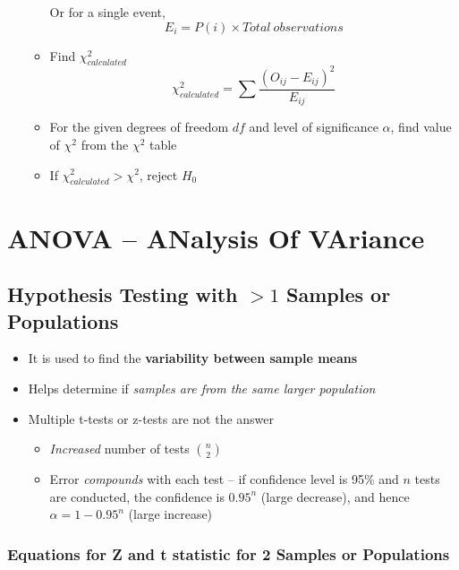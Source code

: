 \documentclass{article}
\begin{document}
\begin{itemize}
\begin{itemize}
\begin{equation}
        \end{equation}
        Or for a single event, 
        \begin{equation}
            E_{i} = P(i) \times {Total\ observations}
        \end{equation}
        \item Find $\chi^2_{calculated}$
        \begin{equation}
            \chi^2_{calculated} = \sum \frac{(O_{ij} - E_{ij})^2}{E_{ij}}
        \end{equation}
        \item For the given degrees of freedom $df$ and level of significance $\alpha$, find value of $\chi^2$ from the $\chi^2$ table
        \item If $\chi^2_{calculated} > \chi^2$, reject $H_0$
    \end{itemize}
\end{itemize}

\section{ANOVA -- ANalysis Of VAriance}

\subsection{Hypothesis Testing with $> 1$ Samples or Populations}

\begin{itemize}
    \item It is used to find the \textbf{variability between sample means}
    \item Helps determine if \textit{samples are from the same larger population}
    \item Multiple t-tests or z-tests are not the answer
    \begin{itemize}
        \item \textit{Increased} number of tests $\binom{n}{2}$
        \item Error \textit{compounds} with each test -- if confidence level is 95\% and $n$ tests are conducted, the confidence is $0.95^n$ (large decrease), and hence $\alpha = 1 - 0.95^n$ (large increase)
    \end{itemize} 
\end{itemize}

\subsubsection{Equations for Z and t statistic for 2 Samples or Populations}
\end{document}

